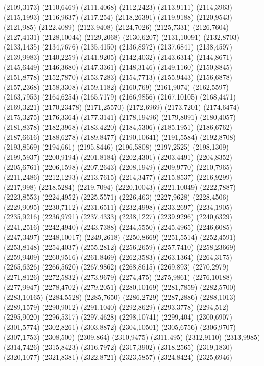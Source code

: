 (2109,3173)
(2110,6469)
(2111,4068)
(2112,2423)
(2113,9111)
(2114,3963)
(2115,1993)
(2116,9637)
(2117,254)
(2118,26391)
(2119,9188)
(2120,9543)
(2121,985)
(2122,4089)
(2123,9408)
(2124,7026)
(2125,7331)
(2126,7604)
(2127,4131)
(2128,10044)
(2129,2068)
(2130,6207)
(2131,10091)
(2132,8703)
(2133,1435)
(2134,7676)
(2135,4150)
(2136,8972)
(2137,6841)
(2138,4597)
(2139,9983)
(2140,2259)
(2141,9205)
(2142,4032)
(2143,6314)
(2144,8671)
(2145,6449)
(2146,3680)
(2147,3361)
(2148,3146)
(2149,1160)
(2150,8845)
(2151,8778)
(2152,7870)
(2153,7283)
(2154,7713)
(2155,9443)
(2156,6878)
(2157,2368)
(2158,3308)
(2159,1182)
(2160,769)
(2161,9074)
(2162,5597)
(2163,7953)
(2164,6254)
(2165,7179)
(2166,9856)
(2167,10105)
(2168,4471)
(2169,3221)
(2170,23478)
(2171,25570)
(2172,6969)
(2173,7201)
(2174,6474)
(2175,3275)
(2176,3364)
(2177,3141)
(2178,19496)
(2179,8091)
(2180,4057)
(2181,8378)
(2182,3968)
(2183,4220)
(2184,5306)
(2185,1951)
(2186,6762)
(2187,6616)
(2188,6278)
(2189,8477)
(2190,10641)
(2191,5584)
(2192,8708)
(2193,8569)
(2194,661)
(2195,8446)
(2196,5808)
(2197,2525)
(2198,1309)
(2199,5937)
(2200,9194)
(2201,8184)
(2202,4301)
(2203,4491)
(2204,8352)
(2205,6761)
(2206,1598)
(2207,2643)
(2208,1949)
(2209,9770)
(2210,7965)
(2211,2486)
(2212,1293)
(2213,7615)
(2214,3477)
(2215,8537)
(2216,9299)
(2217,998)
(2218,5284)
(2219,7094)
(2220,10043)
(2221,10049)
(2222,7887)
(2223,8553)
(2224,4952)
(2225,5571)
(2226,463)
(2227,9628)
(2228,4506)
(2229,9095)
(2230,7112)
(2231,6511)
(2232,4998)
(2233,2697)
(2234,1905)
(2235,9216)
(2236,9791)
(2237,4333)
(2238,1227)
(2239,9296)
(2240,6329)
(2241,2516)
(2242,4940)
(2243,7388)
(2244,5550)
(2245,4965)
(2246,6085)
(2247,3497)
(2248,10017)
(2249,2618)
(2250,8669)
(2251,5514)
(2252,4591)
(2253,8148)
(2254,4037)
(2255,2812)
(2256,2659)
(2257,7410)
(2258,23669)
(2259,9409)
(2260,9516)
(2261,8469)
(2262,3583)
(2263,1364)
(2264,3175)
(2265,6326)
(2266,5620)
(2267,9862)
(2268,8615)
(2269,893)
(2270,2979)
(2271,8126)
(2272,5832)
(2273,9679)
(2274,475)
(2275,9861)
(2276,10188)
(2277,9947)
(2278,4702)
(2279,2051)
(2280,10169)
(2281,7859)
(2282,5700)
(2283,10165)
(2284,5528)
(2285,7650)
(2286,2729)
(2287,2886)
(2288,1013)
(2289,1579)
(2290,9012)
(2291,1040)
(2292,8629)
(2293,3778)
(2294,512)
(2295,9020)
(2296,5317)
(2297,4628)
(2298,10741)
(2299,404)
(2300,6907)
(2301,5774)
(2302,8261)
(2303,8872)
(2304,10501)
(2305,6756)
(2306,9707)
(2307,1753)
(2308,500)
(2309,864)
(2310,9475)
(2311,495)
(2312,9110)
(2313,9985)
(2314,7426)
(2315,8423)
(2316,7972)
(2317,3902)
(2318,2565)
(2319,1830)
(2320,1077)
(2321,8381)
(2322,8721)
(2323,5857)
(2324,8424)
(2325,6946)
